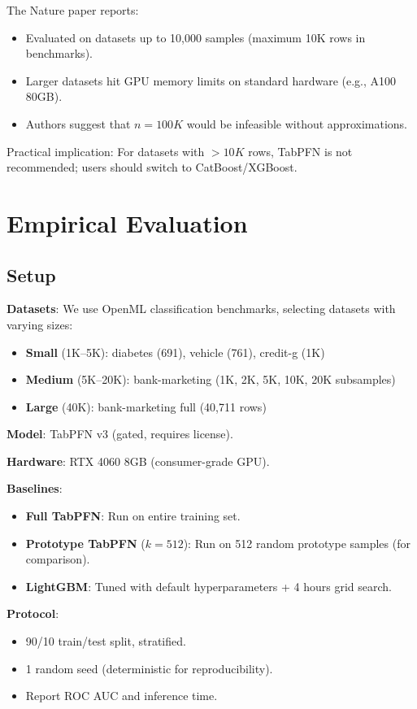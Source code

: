 \documentclass[11pt,a4paper]{article}
\begin{document}
The Nature paper reports:
\begin{itemize}
\item Evaluated on datasets up to 10,000 samples (maximum 10K rows in benchmarks).
\item Larger datasets hit GPU memory limits on standard hardware (e.g., A100 80GB).
\item Authors suggest that $n=100K$ would be infeasible without approximations.
\end{itemize}

Practical implication: For datasets with $> 10K$ rows, TabPFN is not recommended; users should switch to CatBoost/XGBoost.

\section{Empirical Evaluation}

\subsection{Setup}

\textbf{Datasets}: We use OpenML classification benchmarks, selecting datasets with varying sizes:
\begin{itemize}
\item \textbf{Small} (1K--5K): diabetes (691), vehicle (761), credit-g (1K)
\item \textbf{Medium} (5K--20K): bank-marketing (1K, 2K, 5K, 10K, 20K subsamples)
\item \textbf{Large} (40K): bank-marketing full (40,711 rows)
\end{itemize}

\textbf{Model}: TabPFN v3 (gated, requires license).

\textbf{Hardware}: RTX 4060 8GB (consumer-grade GPU).

\textbf{Baselines}:
\begin{itemize}
\item \textbf{Full TabPFN}: Run on entire training set.
\item \textbf{Prototype TabPFN} ($k=512$): Run on 512 random prototype samples (for comparison).
\item \textbf{LightGBM}: Tuned with default hyperparameters + 4 hours grid search.
\end{itemize}

\textbf{Protocol}:
\begin{itemize}
\item 90/10 train/test split, stratified.
\item 1 random seed (deterministic for reproducibility).
\item Report ROC AUC and inference time.
\end{itemize}
\end{document}
